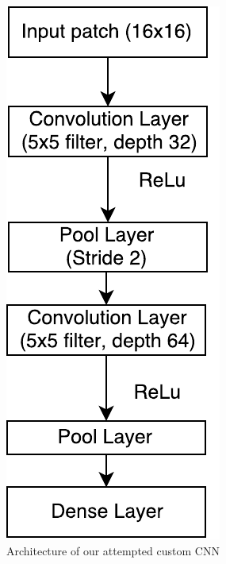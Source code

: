 \documentclass[11pt,conference,compsocconf]{IEEEtran}
\begin{document}
\begin{figure}[h]
\centering
\includegraphics[width=\linewidth,height=0.5\textheight,keepaspectratio]{custom_CNN.pdf}
\caption{Architecture of our attempted custom CNN}
\end{figure}
\end{document}
